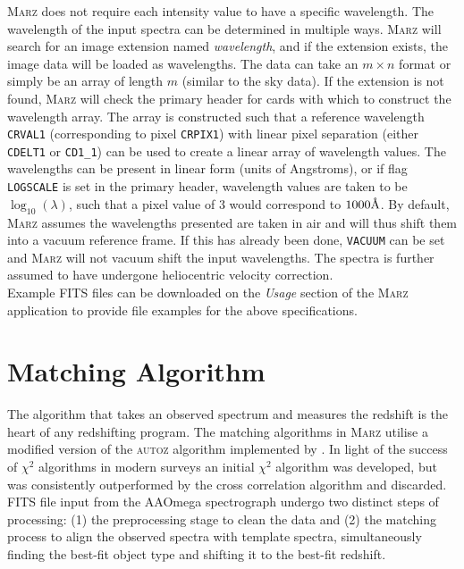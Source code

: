 \documentclass[iop]{emulateapj}
\newcommand{\autoz}{\textsc{autoz}}
\newcommand{\marz}{\textsc{Marz}}
\newcommand{\angstrom}{\mbox{\normalfont\AA}}
\begin{document}
\marz{} does not require each intensity value to have a specific wavelength. The wavelength of the input spectra can be determined in multiple ways. \marz{} will search for an image extension named \textit{wavelength}, and if the extension exists, the image data will be loaded as wavelengths. The data can take an $m\times n$ format or simply be an array of length $m$ (similar to the sky data). If the extension is not found, \marz{} will check the primary header for cards with which to construct the wavelength array. The array is constructed such that a reference wavelength \verb;CRVAL1; (corresponding to pixel \verb;CRPIX1;) with linear pixel separation (either \verb;CDELT1; or \verb;CD1_1;) can be used to create a linear array of wavelength values. The wavelengths can be present in linear form (units of Angstroms), or if flag \verb;LOGSCALE; is set in the primary header, wavelength values are taken to be $\log_{10}(\lambda)$, such that a pixel value of $3$ would correspond to $1000\angstrom$. By default, \marz{} assumes the wavelengths presented are taken in air and will thus shift them into a vacuum reference frame. If this has already been done, \verb;VACUUM; can be set and \marz{} will not vacuum shift the input wavelengths. The spectra is further assumed to have undergone heliocentric velocity correction.\\

Example FITS files can be downloaded on the \textit{Usage} section of the \marz{} application to provide file examples for the above specifications.













\section{Matching Algorithm}

The algorithm that takes an observed spectrum and measures the redshift is the heart of any redshifting program. The matching algorithms in \marz{} utilise a modified version of the \autoz{} algorithm implemented by \citet{baldry2014galaxy}. In light of the success of $\chi^2$ algorithms in modern surveys \citep{bolton2012} an initial $\chi^2$ algorithm was developed, but was consistently outperformed by the cross correlation algorithm and discarded. FITS file input from the AAOmega spectrograph undergo two distinct steps of processing: (1) the preprocessing stage to clean the data and (2) the matching process to align the observed spectra with template spectra, simultaneously finding the best-fit object type and shifting it to the best-fit redshift.\\
\end{document}

